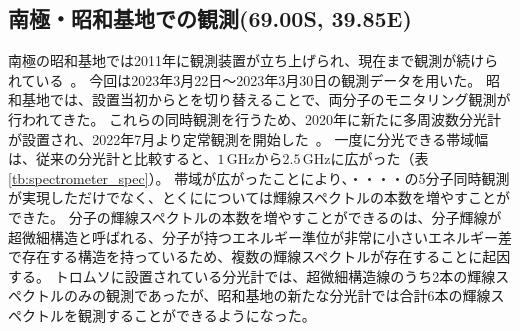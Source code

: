 \subsection{南極・昭和基地での観測(69.00\textdegree S, 39.85\textdegree E)}
\label{subsec:mm_syowa}
南極の昭和基地では2011年に観測装置が立ち上げられ、現在まで観測が続けられている~\cite{isono2014variations,isono2014ground}。
今回は2023年3月22日〜2023年3月30日の観測データを用いた。
昭和基地では、設置当初からとを切り替えることで、両分子のモニタリング観測が行われてきた。
これらの同時観測を行うため、2020年に新たに多周波数分光計が設置され、2022年7月より定常観測を開始した~\cite{iwata2019master,kosegaki2020master,nakajima2020waveguide,sakuma2023superconducting}。
一度に分光できる帯域幅は、従来の分光計と比較すると、$1\, \mathrm{GHz}$から$2.5\, \mathrm{GHz}$に広がった（表\ref{tb:spectrometer_spec}）。
帯域が広がったことにより、・・・・の5分子同時観測が実現しただけでなく、とくにについては輝線スペクトルの本数を増やすことができた。
分子の輝線スペクトルの本数を増やすことができるのは、分子輝線が超微細構造と呼ばれる、分子が持つエネルギー準位が非常に小さいエネルギー差で存在する構造を持っているため、複数の輝線スペクトルが存在することに起因する。
トロムソに設置されている分光計では、超微細構造線のうち2本の輝線スペクトルのみの観測であったが、昭和基地の新たな分光計では合計6本の輝線スペクトルを観測することができるようになった。\par

